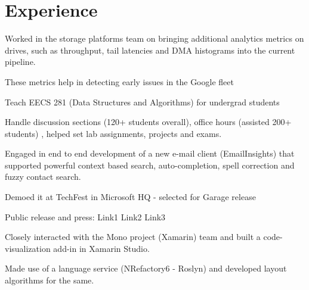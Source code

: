 \documentclass[]{resume-openfont}
\begin{document}
\hfill
\begin{minipage}[t]{0.69\textwidth} 


\section{Experience}

\vspace{\topsep} %
\begin{tightemize}
\item Worked in the storage platforms team on bringing additional analytics metrics on drives, such as throughput, tail latencies and DMA histograms into the current pipeline.
\item These metrics help in detecting early issues in the Google fleet
\end{tightemize}
\sectionsep

\begin{tightemize}
\item Teach EECS 281 (Data Structures and Algorithms) for undergrad students
\item Handle discussion sections (120+ students overall), office hours (assisted 200+ students) , helped set lab assignments, projects and exams.
\end{tightemize}
\sectionsep

\begin{tightemize}
\item Engaged in end to end development of a new e-mail client (EmailInsights) that supported powerful context based search, auto-completion, spell correction and fuzzy contact search. 
\item Demoed it at TechFest in Microsoft HQ - selected for Garage release
\item Public release and press: Link1 Link2 Link3
\end{tightemize}
\sectionsep

\begin{tightemize}
\item Closely interacted with the Mono project (Xamarin) team and built a code-visualization add-in in Xamarin Studio.
\item Made use of a language service (NRefactory6 - Roslyn) and developed layout algorithms for the same.
\end{tightemize}
\sectionsep


\end{minipage}
\end{document}
